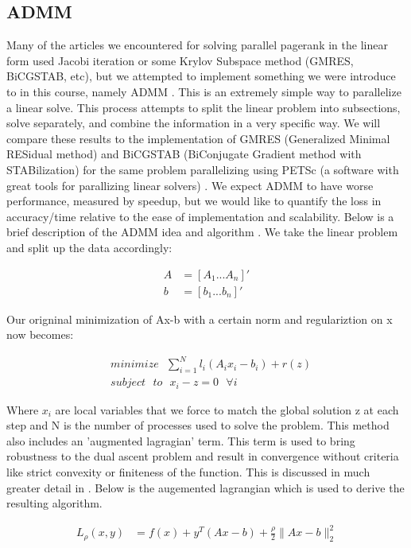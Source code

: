 \documentclass[letterpaper,12pt,onecolumn]{article}
\begin{document}
\subsection{ADMM}

Many of the articles we encountered for solving parallel pagerank in the linear form used Jacobi iteration or some Krylov Subspace method (GMRES, BiCGSTAB, etc), but we attempted to implement something we were introduce to in this course, namely ADMM \cite{ADMM}. This is an extremely simple way to parallelize a linear solve. This process attempts to split the linear problem into subsections, solve separately, and combine the information in a very specific way. 
We will compare these results to the implementation of GMRES (Generalized Minimal RESidual method) and BiCGSTAB (BiConjugate Gradient method with STABilization) for the same problem parallelizing using PETSc (a software with great tools for parallizing linear solvers) \cite{Power Law Graphs}. We expect ADMM to have worse performance, measured by speedup, but we would like to quantify the loss in accuracy/time relative to the ease of implementation and scalability.
\newline
\linebreak
Below is a brief description of the ADMM idea and algorithm \cite{ADMM}.
\newline
We take the linear problem and split up the data accordingly:
\begin{center}
\begin{align}
	A &= \left[ A_{1} ... A_{n} \right]' \\
	b &= \left[ b_{1} ... b_{n} \right]' 
\end{align}
\end{center}
Our origninal minimization of Ax-b with a certain norm and regulariztion on x now becomes:

\begin{center}
\begin{align}
	&minimize \: \: \: \sum_{i=1}^{N} l_{i}(A_{i}x_{i} - b_{i}) + r(z) \\
	&subject \: \: \: to \: \: \: x_{i} - z = 0 \: \: \: \forall i
\end{align}
\end{center}
Where $x_{i}$ are local variables that we force to match the global solution z at each step and N is the number of processes used to solve the problem. This method also includes an 'augmented lagragian' term. This term is used to bring robustness to the dual ascent problem and result in convergence without criteria like strict convexity or finiteness of the function. This is discussed in much greater detail in \cite{ADMM}. Below is the augemented lagrangian which is used to derive the resulting algorithm.
\newline
\begin{center}
  \begin{align}
		L_{\rho}(x,y) &= f(x) + y^{T}(Ax-b) + \frac{\rho}{2}\|Ax - b\|_{2}^{2} \\
  \end{align}
\end{center}
\end{document}
